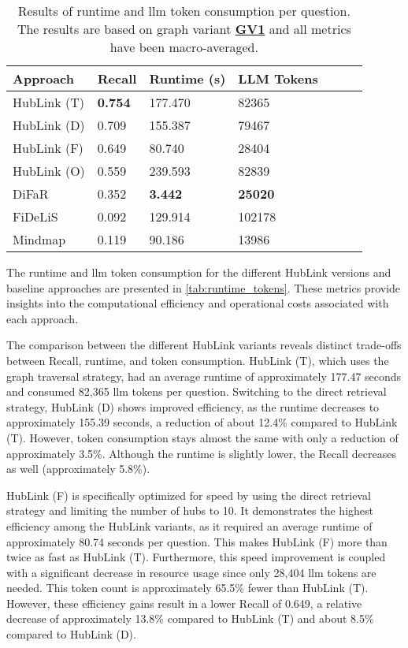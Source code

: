 \begin{table}[t]
\centering
\begin{tabular}{@{}lllllll@{}}
\toprule
Approach & Recall & Runtime (s) & LLM Tokens \\
\midrule 
HubLink (T) & \textbf{0.754} & 177.470 & 82365 \\
HubLink (D) & 0.709 & 155.387 & 79467 \\
HubLink (F) & 0.649 & 80.740 & 28404 \\
HubLink (O) & 0.559 & 239.593 & 82839 \\
DiFaR & 0.352 & \textbf{3.442} & \textbf{25020} \\
FiDeLiS & 0.092 & 129.914 & 102178  \\
Mindmap & 0.119 & 90.186 & 13986 \\
\bottomrule 
\end{tabular}%
\caption[Results on Runtime and LLM Token Consumption]{Results of runtime and \gls{llm} token consumption per question. The results are based on graph variant \hyperref[enum:gv1]{\textbf{GV1}} and all metrics have been macro-averaged.}
\label{tab:runtime_tokens}
\end{table}

The runtime and \gls{llm} token consumption for the different HubLink versions and baseline approaches are presented in \autoref{tab:runtime_tokens}. These metrics provide insights into the computational efficiency and operational costs associated with each approach.

The comparison between the different HubLink variants reveals distinct trade-offs between Recall, runtime, and token consumption. HubLink (T), which uses the graph traversal strategy, had an average runtime of approximately 177.47 seconds and consumed 82,365 \gls{llm} tokens per question. Switching to the direct retrieval strategy, HubLink (D) shows improved efficiency, as the runtime decreases to approximately 155.39 seconds, a reduction of about 12.4\% compared to HubLink (T). However, token consumption stays almost the same with only a reduction of approximately 3.5\%. Although the runtime is slightly lower, the Recall decreases as well (approximately 5.8\%).

HubLink (F) is specifically optimized for speed by using the direct retrieval strategy and limiting the number of hubs to 10. It demonstrates the highest efficiency among the HubLink variants, as it required an average runtime of approximately 80.74 seconds per question. This makes HubLink (F) more than twice as fast as HubLink (T). Furthermore, this speed improvement is coupled with a significant decrease in resource usage since only 28,404 \gls{llm} tokens are needed. This token count is approximately 65.5\% fewer than HubLink (T). However, these efficiency gains result in a lower Recall of 0.649, a relative decrease of approximately 13.8\% compared to HubLink (T) and about 8.5\% compared to HubLink (D).

